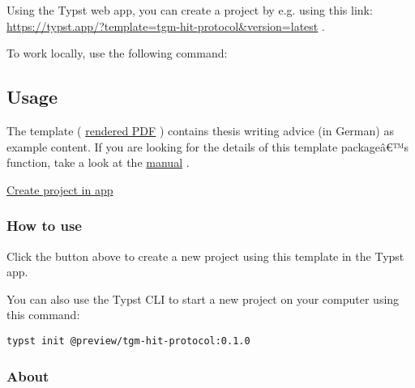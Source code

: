 Using the Typst web app, you can create a project by e.g. using this
link: \url{https://typst.app/?template=tgm-hit-protocol&version=latest}
.

To work locally, use the following command:

\begin{Shaded}
\begin{Highlighting}[]
\end{Highlighting}
\end{Shaded}

\subsection{Usage}\label{usage}

The template (
\href{https://github.com/typst/packages/raw/main/packages/preview/tgm-hit-protocol/0.1.0/main.pdf}{rendered
PDF} ) contains thesis writing advice (in German) as example content. If
you are looking for the details of this template packageâ€™s function,
take a look at the
\href{https://github.com/typst/packages/raw/main/packages/preview/tgm-hit-protocol/0.1.0/docs/manual.pdf}{manual}
.

\href{/app?template=tgm-hit-protocol&version=0.1.0}{Create project in
app}

\subsubsection{How to use}\label{how-to-use}

Click the button above to create a new project using this template in
the Typst app.

You can also use the Typst CLI to start a new project on your computer
using this command:

\begin{verbatim}
typst init @preview/tgm-hit-protocol:0.1.0
\end{verbatim}



\subsubsection{About}\label{about}

